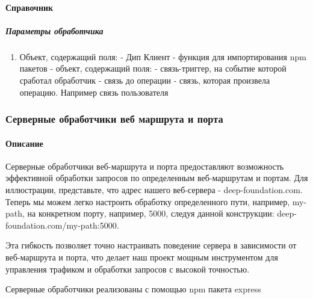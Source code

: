 \paragraph{Справочник}
\subparagraph{Параметры обработчика}
\begin{enumerate}
  \item Объект, содержащий поля:
         - Дип Клиент
         - функция для импортирования npm пакетов
         - объект, содержащий поля:
         - связь-триггер, на событие которой сработал
        обработчик
         - связь до операции
         - связь, которая произвела операцию.
        Например связь пользователя
\end{enumerate}
\subsubsection{Серверные обработчики веб маршрута и порта}
\paragraph{Описание}
Серверные обработчики веб-маршрута и порта предоставляют возможность
эффективной обработки запросов по определенным веб-маршрутам и портам. Для
иллюстрации, представьте, что адрес нашего веб-сервера - deep-foundation.com.
Теперь мы можем легко настроить обработку определенного пути, например,
my-path, на конкретном порту, например, 5000, следуя данной конструкции:
deep-foundation.com/my-path:5000.

Эта гибкость позволяет точно настраивать поведение сервера в зависимости от
веб-маршрута и порта, что делает наш проект мощным инструментом для управления
трафиком и обработки запросов с высокой точностью.

Серверные обработчики реализованы с помощью npm пакета express
